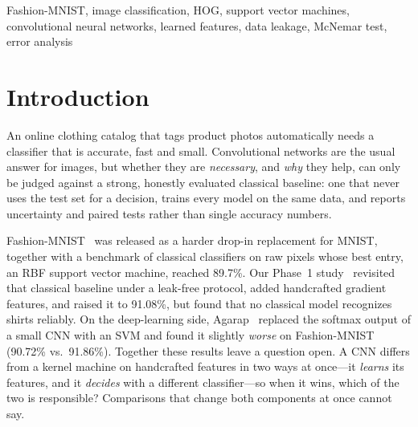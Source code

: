 \documentclass[conference]{IEEEtran}
\begin{document}
\begin{IEEEkeywords}
Fashion-MNIST, image classification, HOG, support vector machines, convolutional neural networks, learned features,
data leakage, McNemar test, error analysis
\end{IEEEkeywords}

\section{Introduction}
\label{sec:intro}
An online clothing catalog that tags product photos automatically needs a classifier that is accurate, fast and small.
Convolutional networks are the usual answer for images, but whether they are \emph{necessary},
and \emph{why} they help, can only be judged against a strong, honestly evaluated classical baseline: one that never uses
the test set for a decision, trains every model on the same data, and reports uncertainty and paired tests rather than
single accuracy numbers.

Fashion-MNIST~\cite{xiao2017fashion} was released as a harder drop-in replacement for MNIST, together with a benchmark of
classical classifiers on raw pixels whose best entry, an RBF support vector machine, reached 89.7\%. Our Phase~1
study~\cite{phase1report} revisited that classical baseline under a leak-free protocol, added handcrafted gradient
features, and raised it to 91.08\%, but found that no classical model recognizes shirts reliably. On the deep-learning
side, Agarap~\cite{agarap2017cnnsvm} replaced the softmax output of a small CNN with an SVM and found it slightly
\emph{worse} on Fashion-MNIST (90.72\% vs.\ 91.86\%). Together these results leave a question open. A CNN differs from a
kernel machine on handcrafted features in two ways at once---it \emph{learns} its features, and it \emph{decides} with a
different classifier---so when it wins, which of the two is responsible? Comparisons that change both components at once
cannot say.
\end{document}
